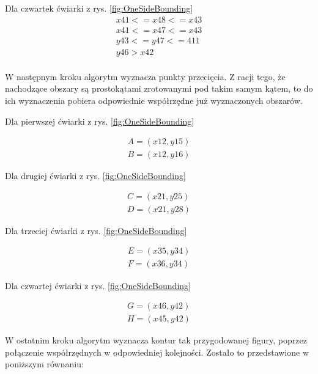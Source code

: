 Dla czwartek ćwiarki z rys. \ref{fig:OneSideBounding}
\begin{equation}
\begin{split}
x41 <= x48 <= x43 \\
x41 <= x47 <= x43 \\
y43 <= y47 <= 411 \\
y46 > x42 \\
\end{split}
\end{equation}

W następnym kroku algorytm wyznacza punkty przecięcia. Z racji tego, że nachodzące obszary są prostokątami zrotowanymi pod takim samym kątem, to do ich wyznaczenia pobiera odpowiednie współrzędne już wyznaczonych obszarów.

Dla pierwszej ćwiarki z rys. \ref{fig:OneSideBounding}

\begin{equation}
\begin{split}
A = (x12, y15) \\
B = (x12, y16)
\end{split}
\end{equation}

Dla drugiej ćwiarki z rys. \ref{fig:OneSideBounding}

\begin{equation}
\begin{split}
C = (x21, y25) \\
D = (x21, y28)
\end{split}
\end{equation}

Dla trzeciej ćwiarki z rys. \ref{fig:OneSideBounding}

\begin{equation}
\begin{split}
E = (x35, y34) \\
F = (x36, y34)
\end{split}
\end{equation}


Dla czwartej ćwiarki z rys. \ref{fig:OneSideBounding}

\begin{equation}
\begin{split}
G = (x46, y42) \\
H = (x45, y42)
\end{split}
\end{equation}

W ostatnim kroku algorytm wyznacza kontur tak przygodowanej figury, poprzez połączenie współrzędnych w odpowiedniej kolejności. Zostało to przedstawione w poniższym równaniu:

